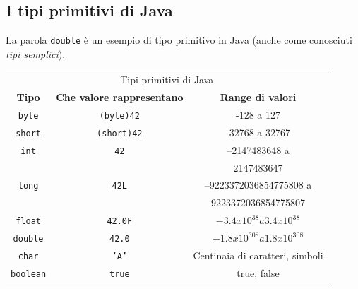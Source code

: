 \subsection*{I tipi primitivi di Java}
\begin{frame}
\begin{block}{}
La parola \texttt{double} è un esempio di tipo primitivo in Java (anche come conosciuti \textit{tipi semplici}).
\end{block}
\begin{table}[h]\footnotesize
\begin{tabular}{c c c}
\toprule
\multicolumn{3}{c}{Tipi primitivi di Java}\\
\cmidrule(r){1-3}
\textbf{Tipo} & \textbf{Che valore rappresentano} & \textbf{Range di valori}\\
\hline
\texttt{byte} & \texttt{(byte)42} & -128 a 127 \\
\hline
\texttt{short} & \texttt{(short)42} & -32768 a 32767 \\
\hline
\texttt{int} & \texttt{42} & –2147483648 a \\ 
 & & 2147483647\\
\hline
\texttt{long} & \texttt{42L} & –9223372036854775808 a\\
& & 9223372036854775807\\
\hline
\texttt{float} & \texttt{42.0F} & $-3.4x10^{38} a 3.4x10^{38}$\\
\hline
\texttt{double} & \texttt{42.0} & $-1.8x10^{308} a 1.8x10^{308}$\\
\hline
\texttt{char} & \texttt{'A'} & Centinaia di caratteri, simboli \\
\hline
\texttt{boolean} & \texttt{true} & true, false\\
\bottomrule
\end{tabular}
\end{table}
\end{frame}

